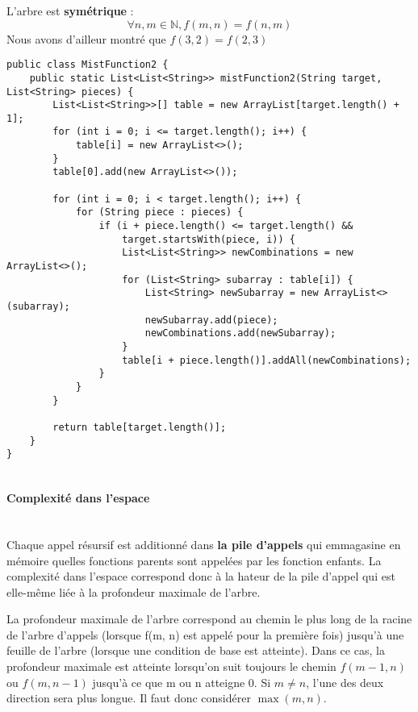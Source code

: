 \documentclass[10pt]{report}
\begin{document}
  \begin{note}{}{}
      L'arbre est \textbf{symétrique} : 
      \[ \forall n, m \in \mathbb{N}, f(m, n) = f(n, m) \]   
      Nous avons d'ailleur montré que $f(3, 2) = f(2, 3)$
  \end{note}        
  \begin{figure*}
   \begin{lstlisting}[style=JavaDraculaWhite]
 public class MistFunction2 {
    public static List<List<String>> mistFunction2(String target, List<String> pieces) {
        List<List<String>>[] table = new ArrayList[target.length() + 1];
        for (int i = 0; i <= target.length(); i++) {
            table[i] = new ArrayList<>();
        }
        table[0].add(new ArrayList<>());

        for (int i = 0; i < target.length(); i++) {
            for (String piece : pieces) {
                if (i + piece.length() <= target.length() &&
                    target.startsWith(piece, i)) {
                    List<List<String>> newCombinations = new ArrayList<>();
                    for (List<String> subarray : table[i]) {
                        List<String> newSubarray = new ArrayList<>(subarray);
                        newSubarray.add(piece);
                        newCombinations.add(newSubarray);
                    }
                    table[i + piece.length()].addAll(newCombinations);
                }
            }
        }

        return table[target.length()];
    }
}
    
  \end{lstlisting}    
  \end{figure*}
  \paragraph{Complexité dans l'espace}
  \mbox{}\\
  Chaque appel résursif est additionné dans 
  \textbf{la pile d'appels} qui emmagasine en mémoire 
  quelles fonctions parents sont appelées par les fonction enfants. 
  La complexité dans l'espace correspond donc à la hateur de la pile d'appel 
  qui est elle-même liée à la profondeur maximale de l'arbre. 


  
  La profondeur maximale de l'arbre correspond 
  au chemin le plus long de la racine de l'arbre d'appels (lorsque f(m, n) 
  est appelé pour la première fois) jusqu'à une feuille de l'arbre 
  (lorsque une condition de base est atteinte). 
  Dans ce cas, la profondeur maximale est atteinte lorsqu'on 
  suit toujours le chemin $f(m - 1, n)  $ou $f(m, n - 1)$ jusqu'à
  ce que m ou n atteigne 0. Si $m \neq n$, l'une des deux direction sera plus longue. 
  Il faut donc considérer $\max(m, n)$. 
\end{document}
